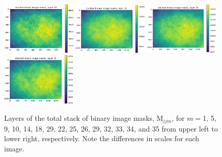 \documentclass[letterpaper,11pt]{article}
\newcommand{\Mu}{\mathrm{M}}
\begin{document}
\begin{figure}[!ht]
\includegraphics[width=0.32\textwidth]{images/measuring_flatfield_corrections/mask_stack_layers/mask_stack_layer_32}
\includegraphics[width=0.32\textwidth]{images/measuring_flatfield_corrections/mask_stack_layers/mask_stack_layer_33}
\includegraphics[width=0.32\textwidth]{images/measuring_flatfield_corrections/mask_stack_layers/mask_stack_layer_34}
\includegraphics[width=0.32\textwidth]{images/measuring_flatfield_corrections/mask_stack_layers/mask_stack_layer_35}
\caption{\footnotesize Layers of the total stack of binary image masks, $\Mu_{ijm}$, for $m=$1, 5, 9, 10, 14, 18, 29, 22, 25, 26, 29, 32, 33, 34, and 35 from upper left to lower right, respectively. Note the differences in scales for each image.}
\label{fig:mask_stack_layers}
\end{figure}
\end{document}
